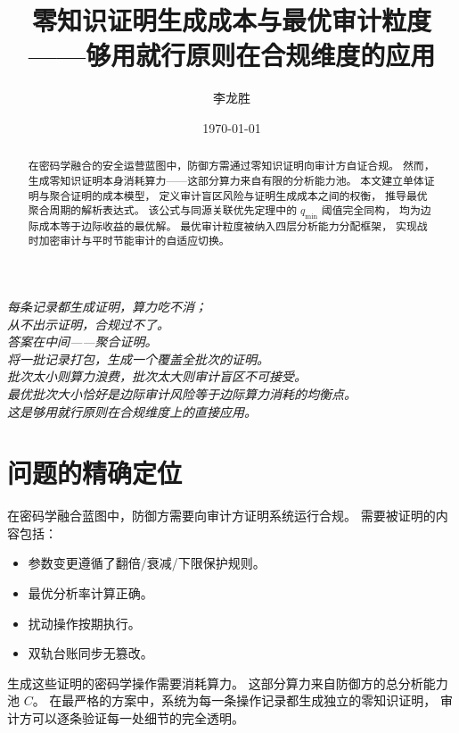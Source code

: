 \documentclass[11pt,a4paper]{article}
\title{零知识证明生成成本与最优审计粒度\\
——够用就行原则在合规维度的应用}
\author{李龙胜}
\date{\today}
\begin{document}
\maketitle

\begin{center}
\textit{
每条记录都生成证明，算力吃不消；\\
从不出示证明，合规过不了。\\
答案在中间——聚合证明。\\
将一批记录打包，生成一个覆盖全批次的证明。\\
批次太小则算力浪费，批次太大则审计盲区不可接受。\\
最优批次大小恰好是边际审计风险等于边际算力消耗的均衡点。\\
这是够用就行原则在合规维度上的直接应用。
}
\end{center}

\vspace{5mm}

\begin{abstract}
在密码学融合的安全运营蓝图中，防御方需通过零知识证明向审计方自证合规。
然而，生成零知识证明本身消耗算力——这部分算力来自有限的分析能力池。
本文建立单体证明与聚合证明的成本模型，
定义审计盲区风险与证明生成成本之间的权衡，
推导最优聚合周期的解析表达式。
该公式与同源关联优先定理中的 \(q_{\min}\) 阈值完全同构，
均为边际成本等于边际收益的最优解。
最优审计粒度被纳入四层分析能力分配框架，
实现战时加密审计与平时节能审计的自适应切换。
\end{abstract}

\tableofcontents

\section{问题的精确定位}

在密码学融合蓝图中，防御方需要向审计方证明系统运行合规。
需要被证明的内容包括：
\begin{itemize}
    \item 参数变更遵循了翻倍/衰减/下限保护规则。
    \item 最优分析率计算正确。
    \item 扰动操作按期执行。
    \item 双轨台账同步无篡改。
\end{itemize}

生成这些证明的密码学操作需要消耗算力。
这部分算力来自防御方的总分析能力池 \(C\)。
在最严格的方案中，系统为每一条操作记录都生成独立的零知识证明，
审计方可以逐条验证每一处细节的完全透明。
\end{document}
